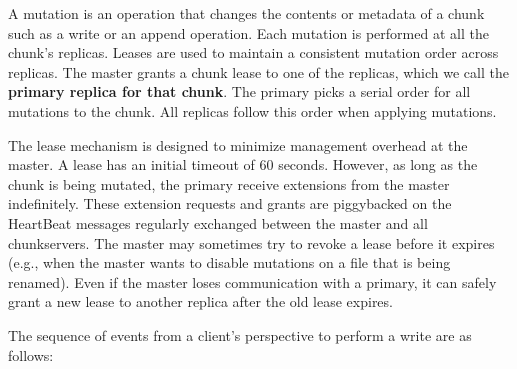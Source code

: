 \documentclass{article}
\begin{document}
A mutation is an operation that changes the contents or metadata of a chunk such as a write or an append operation. Each mutation is performed at all the chunk’s replicas. Leases are used to maintain a consistent mutation order across replicas. The master grants a chunk lease to one of the replicas, which we call the \textbf{primary replica for that chunk}. The primary picks a serial order for all mutations to the chunk. All replicas follow this order when applying mutations. 

The lease mechanism is designed to minimize management overhead at the master. A lease has an initial timeout of 60 seconds. However, as long as the chunk is being mutated, the primary receive extensions from the master indefinitely. These extension requests and grants are piggybacked on the HeartBeat messages regularly exchanged between the master and all chunkservers.  The master may sometimes try to revoke a lease before it expires (e.g., when the master wants to disable mutations on a file that is being renamed). Even if the master loses communication with a primary, it can safely grant a new lease to another replica after the old lease expires.

The sequence of events from a client's perspective to perform a write are as follows:
\end{document}
